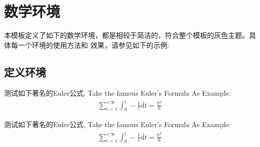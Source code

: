 \documentclass[lang=cn, math=mathptmx]{ZLaTeX}
\begin{document}
\section{数学环境}
本模板定义了如下的数学环境，都是相较于简洁的，符合整个模板的灰色主题。具体每一个环境的使用方法和
效果，请参见如下的示例:

\subsection{定义环境}
\begin{bytes}[10]
\begin{definition}
    测试如下著名的Euler公式, Take the famous Euler's Formula As Example:
    \begin{align}
        \sum_{i=1}^{+\infty}{\int_{0}^{i}-\frac{1}{t}\mathrm{d}t} = \frac{\pi^2}{6}
    \end{align}
\end{definition}
\end{bytes}
\begin{definition}
测试如下著名的Euler公式, Take the famous Euler's Formula As Example:
\begin{align}
    \sum_{i=1}^{+\infty}{\int_{0}^{i}-\frac{1}{t}\mathrm{d}t} = \frac{\pi^2}{6}
\end{align}
\end{definition}

\end{document}
